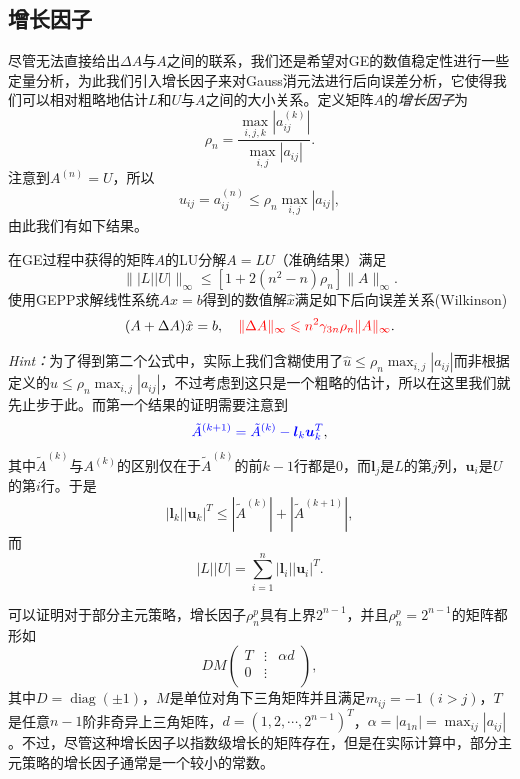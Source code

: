 \documentclass[a4paper,10pt]{ctexart}
\begin{document}
\subsection{增长因子}
尽管无法直接给出$ \Delta A $与$ A $之间的联系，我们还是希望对GE的数值稳定性进行一些定量分析，为此我们引入增长因子来对Gauss消元法进行后向误差分析，它使得我们可以相对粗略地估计$ L $和$ U $与$ A $之间的大小关系。定义矩阵$ A $的\emph{增长因子}为
\begin{equation}
    \rho_n = \frac{\max\limits_{i,j,k}|a_{ij}^{(k)}|}{\max\limits_{i,j}|a_{ij}|}.
\end{equation}
注意到$ A^{(n)} = U $，所以
\[
    u_{ij} = a_{ij}^{(n)} \leqslant \rho_n \max_{i,j}|a_{ij}|,
\]
由此我们有如下结果。

\begin{theorem}
    在GE过程中获得的矩阵$ A $的LU分解$ A = LU $（准确结果）满足
    \begin{equation}
        \| |L| |U|  \|_\infty \leqslant [1+2(n^2-n)\rho_n] \| A \|_\infty.
    \end{equation}
    使用GEPP求解线性系统$ Ax=b $得到的数值解$ \hat{x} $满足如下后向误差关系(Wilkinson)
    \begin{equation}
        (A+\Delta A)\hat{x} = b,\quad \textcolor{red}{\| \Delta A \|_\infty \leqslant n^2 \gamma_{3n} \rho_n \| A \|_\infty}.
    \end{equation}
\end{theorem}
\noindent \emph{Hint：}为了得到第二个公式中，实际上我们含糊使用了$ \hat{u}\leqslant \rho_n \max_{i,j}|a_{ij}| $而非根据定义的$ u\leqslant \rho_n \max_{i,j}|a_{ij}| $，不过考虑到这只是一个粗略的估计，所以在这里我们就先止步于此。而第一个结果的证明需要注意到
\[
    \textcolor{blue}{\tilde{A}^{(k+1)} = \tilde{A}^{(k)} - \bm{l}_k \bm{u}_k^T},
\]
其中$ \tilde{A}^{(k)} $与$ A^{(k)} $的区别仅在于$ \tilde{A}^{(k)} $的前$ k-1 $行都是$ 0 $，而$ \bm{l}_j $是$ L $的第$ j $列，$ \bm{u}_i $是$ U $的第$ i $行。于是
\[
    |\bm{l}_k| |\bm{u}_k|^T \leqslant |\tilde{A}^{(k)}| + |\tilde{A}^{(k+1)}|,
\]
而
\[
    |L| |U| = \sum_{i=1}^n |\bm{l}_i| |\bm{u}_i|^T.
\]

可以证明对于部分主元策略，增长因子$ \rho^p_n $具有上界$ 2^{n-1} $，并且$ \rho^p_n = 2^{n-1} $的矩阵都形如
\[
    DM \begin{pmatrix}
        T & \vdots & \alpha d\\
        0 & \vdots & \\
    \end{pmatrix},
\]
其中$ D = \operatorname{diag}(\pm 1) $，$ M $是单位对角下三角矩阵并且满足$ m_{ij} = -1\ (i>j) $，$ T $是任意$ n-1 $阶非奇异上三角矩阵，$ d = (1,2,\cdots ,2^{n-1})^T $，$ \alpha = |a_{1n}| = \max_{ij}|a_{ij}| $。不过，尽管这种增长因子以指数级增长的矩阵存在，但是在实际计算中，部分主元策略的增长因子通常是一个较小的常数。
\end{document}
